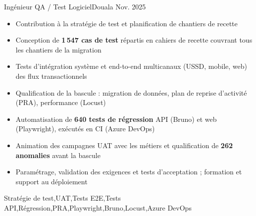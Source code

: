 %


\begin{experiences}
     {Ingénieur QA / Test Logiciel}{}{Douala}
    {Nov. 2025} {
                      \begin{itemize}
                        \item Contribution à la stratégie de test et planification de chantiers de recette
                        \item Conception de \textbf{1\,547 cas de test} répartis en cahiers de recette couvrant tous les chantiers de la migration
                        \item Tests d'intégration système et end-to-end multicanaux (USSD, mobile, web) des flux transactionnels
                        \item Qualification de la bascule : migration de données, plan de reprise d'activité (PRA), performance (Locust)
                        \item Automatisation de \textbf{640 tests de régression} API (Bruno) et web (Playwright), exécutés en CI (Azure DevOps)
                        \item Animation des campagnes UAT avec les métiers et qualification de \textbf{262 anomalies} avant la bascule
                      \end{itemize}
                      \begin{itemize}
                        \item Paramétrage, validation des exigences et tests d'acceptation ; formation et support au déploiement
                      \end{itemize}
                    }
                    {Stratégie de test,UAT,Tests E2E,Tests API,Régression,PRA,Playwright,Bruno,Locust,Azure DevOps}

\end{experiences}

